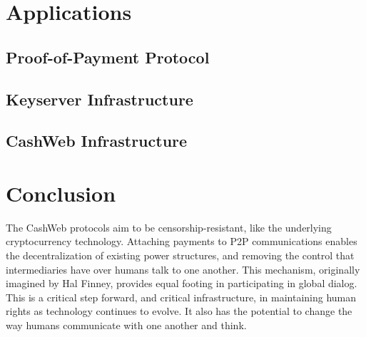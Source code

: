 \documentclass{article}
\begin{document}
\section{Applications}

\subsection{Proof-of-Payment Protocol}


\subsection{Keyserver Infrastructure}

\subsection{CashWeb Infrastructure}


\section{Conclusion}

The CashWeb protocols aim to be censorship-resistant, like the underlying cryptocurrency technology. Attaching payments to P2P communications enables the decentralization of existing power structures, and removing the control that intermediaries have over humans talk to one another. This mechanism, originally imagined by Hal Finney\cite{finney2004rpow}, provides equal footing in participating in global dialog. This is a critical step forward, and critical infrastructure, in maintaining human rights as technology continues to evolve. It also has the potential to change the way humans communicate with one another and think.

\cite{nakamoto2008bpp}




\end{document}
